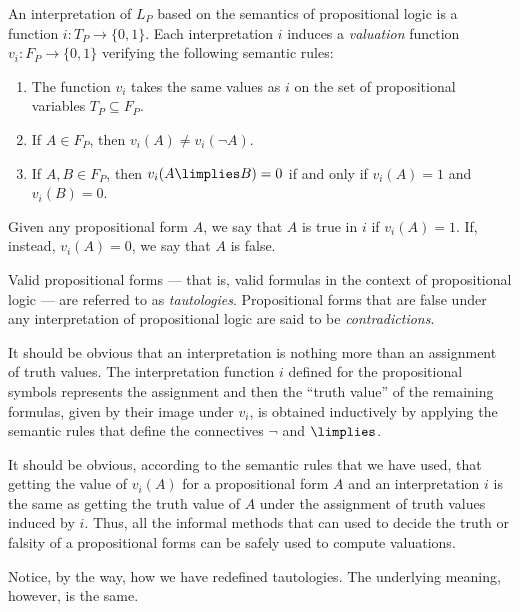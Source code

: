 \begin{definition}
An interpretation of $L_P$ based on the semantics of propositional logic is a function $i : T_P \longrightarrow \{0,1\}$. Each interpretation $i$ induces a \emph{valuation} function $v_i: F_P \longrightarrow \{0,1\}$  verifying the following semantic rules:
\begin{enumerate}
\item The function $v_i$ takes the same values as $i$ on the set of propositional variables $T_P \subseteq F_P$.
\item If $A\in F_P$, then $v_i(A) \neq v_i(\lnot A)$.
\item If $A,B\in F_P$, then $v_i(A\limplies B) = 0$ if and only if $v_i(A) = 1$ and $v_i(B) = 0$.
\end{enumerate}
Given any propositional form $A$, we say that $A$ is true in $i$ if $v_i(A) = 1$. If, instead, $v_i(A) = 0$, we say that $A$ is false.

Valid propositional forms --- that is, valid formulas in the context of propositional logic --- are referred to as \emph{tautologies}.
Propositional forms that are false under any interpretation of propositional logic are said to be \emph{contradictions}.
\end{definition}

\begin{para}
It should be obvious that an interpretation is nothing more than an assignment of truth values. The interpretation function $i$ defined for the propositional symbols represents the assignment and then the ``truth value'' of the remaining formulas, given by their image under $v_i$, is obtained inductively by applying the semantic rules that define the connectives $\lnot$ and $\limplies$.

It should be obvious, according to the semantic rules that we have used, that getting the value of $v_i(A)$ for a propositional form $A$ and an interpretation $i$ is the same as getting the truth value of $A$ under the assignment of truth values induced by $i$. Thus, all the informal methods that can used to decide the truth or falsity of a propositional forms can be safely used to compute valuations.

Notice, by the way, how we have redefined tautologies. The underlying meaning, however, is the same.
\end{para}


